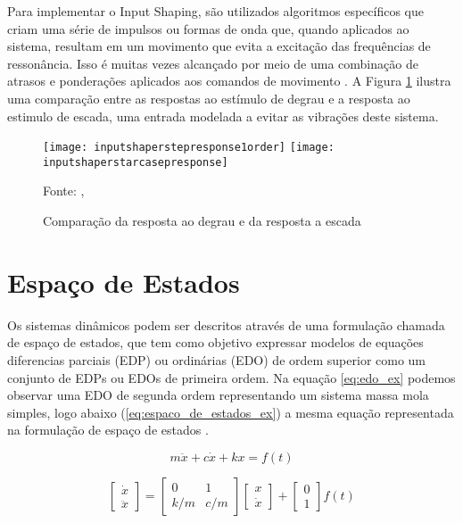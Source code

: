 Para implementar o Input Shaping, são utilizados algoritmos específicos que criam uma série de impulsos ou formas de onda que, quando aplicados ao sistema, resultam em um movimento que evita a excitação das frequências de ressonância. Isso é muitas vezes alcançado por meio de uma combinação de atrasos e ponderações aplicados aos comandos de movimento \cite{singhose97}. A Figura \ref{fig:degr_vs_esc} ilustra uma comparação entre as respostas ao estímulo de degrau e a resposta ao estimulo de escada, uma entrada modelada a evitar as vibrações deste sistema.

\begin{figure}[H]
    \centering
    \caption{Comparação da resposta ao degrau e da resposta a escada}
    \texttt{[image: inputshaperstepresponse1order]}
    \texttt{[image: inputshaperstarcasepresponse]}

    {\footnotesize Fonte: \citeauthor{singhose97}, \citeyear{singhose97}}
    \label{fig:degr_vs_esc}
\end{figure}

\section{Espaço de Estados}

Os sistemas dinâmicos podem ser descritos através de uma formulação chamada de espaço de estados, que tem como objetivo expressar modelos de equações diferencias parciais (EDP) ou ordinárias (EDO) de ordem superior como um conjunto de EDPs ou EDOs de primeira ordem. Na equação \ref{eq:edo_ex} podemos observar uma EDO de segunda ordem representando um sistema massa mola simples, logo abaixo (\ref{eq:espaco_de_estados_ex}) a mesma equação representada na formulação de espaço de estados \cite{hamilton94}.

\begin{equation}
    \label{eq:edo_ex}
    m \ddot x+c \dot x+kx = f(t)
\end{equation}

\begin{equation}
    \label{eq:espaco_de_estados_ex}
    \begin{bmatrix}
        \dot x \\
        \ddot x
    \end{bmatrix}
    =
    \begin{bmatrix}
        0 & 1 \\
        k/m & c/m
    \end{bmatrix}
    \begin{bmatrix}
        x \\
        \dot x
    \end{bmatrix}
    +
    \begin{bmatrix}
        0 \\
        1
    \end{bmatrix}
    f(t)
\end{equation}

